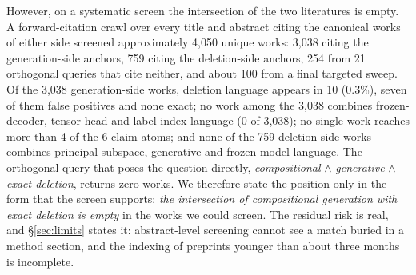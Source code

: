 However, on a systematic screen the intersection of the two literatures is empty. A
forward-citation crawl over every title and abstract citing the canonical works of either side
screened approximately 4,050 unique works: 3,038 citing the generation-side anchors, 759 citing
the deletion-side anchors, 254 from 21 orthogonal queries that cite neither, and about 100 from
a final targeted sweep. %
Of the 3,038 generation-side works, deletion language appears in 10 (0.3\%), seven of them
false positives and none exact; no work among the 3,038 combines frozen-decoder, tensor-head
and label-index language (0 of 3,038); no single work reaches more than 4 of the 6 claim atoms;
and none of the 759 deletion-side works combines principal-subspace, generative and
frozen-model language. %
The orthogonal query that poses the question directly, \emph{compositional} $\wedge$
\emph{generative} $\wedge$ \emph{exact deletion}, returns zero works.
We therefore state the position only in the form that the screen supports: \emph{the
intersection of compositional generation with exact deletion is empty} in the works we could
screen. The residual risk is real, and \S\ref{sec:limits} states it: abstract-level screening
cannot see a match buried in a method section, and the indexing of preprints younger than about
three months is incomplete.


